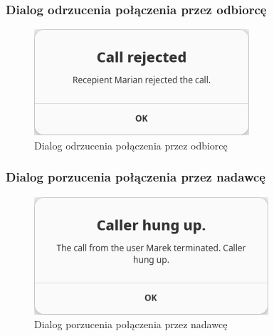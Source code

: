 \subsubsection{Dialog odrzucenia połączenia przez odbiorcę}

\begin{figure}[H]
    \centering
    \includegraphics[width=.4\textwidth]{img/gui/screen_recepient_reject}
    \caption{Dialog odrzucenia połączenia przez odbiorcę}
\end{figure}

\subsubsection{Dialog porzucenia połączenia przez nadawcę}

\begin{figure}[H]
    \centering
    \includegraphics[width=.4\textwidth]{img/gui/screen_caller_hungup}
    \caption{Dialog porzucenia połączenia przez nadawcę}
\end{figure}
